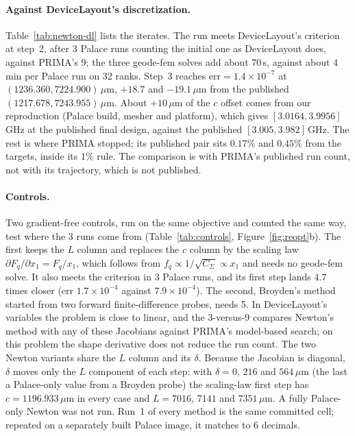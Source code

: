 \documentclass{anvil-paper}
\begin{document}
\paragraph{Against DeviceLayout's discretization.}
Table~\ref{tab:newton-dl} lists the iterates. The run meets DeviceLayout's
criterion at step~2, after 3 Palace runs counting the initial one as
DeviceLayout does, against PRIMA's 9; the three geode-fem solves add about
$70$\,s, against about $4$\,min per Palace run on 32 ranks. Step~3 reaches
$\mathrm{err} = 1.4\times10^{-7}$ at $(1236.360, 7224.900)\,\mu$m, $+18.7$
and $-19.1\,\mu$m from the published $(1217.678, 7243.955)\,\mu$m. About
$+10\,\mu$m of the $c$ offset comes from our reproduction (Palace build,
mesher and platform), which gives $[3.0164, 3.9956]$\,GHz at the published
final design, against the published $[3.005, 3.982]$\,GHz. The rest is
where PRIMA stopped; its published pair sits $0.17\%$ and $0.45\%$ from the
targets, inside its $1\%$ rule. The comparison is with PRIMA's published
run count, not with its trajectory, which is not published.

\paragraph{Controls.}
Two gradient-free controls, run on the same objective and counted the same
way, test where the 3 runs come from (Table~\ref{tab:controls},
Figure~\ref{fig:reopt}b). The first keeps the $L$ column and replaces the
$c$ column by the scaling law $\partial F_q/\partial x_1 = F_q/x_1$, which
follows from $f_q \propto 1/\sqrt{C_\Sigma} \propto x_1$ and needs no
geode-fem solve. It also meets the criterion in 3 Palace runs, and its first
step lands $4.7$ times closer (err $1.7\times10^{-4}$ against
$7.9\times10^{-4}$). The second, Broyden's method \citep{broyden1965class}
started from two forward finite-difference probes, needs 5. In
DeviceLayout's variables the problem is close to linear, and the 3-versus-9
compares Newton's method with any of these Jacobians against PRIMA's
model-based search; on this problem the shape derivative does not reduce
the run count. The two Newton variants share the $L$ column and its
$\delta$. Because the Jacobian is diagonal, $\delta$ moves only the $L$
component of each step: with $\delta = 0$, $216$ and $564\,\mu$m (the last
a Palace-only value from a Broyden probe) the scaling-law first step has
$c = 1196.933\,\mu$m in every case and $L = 7016$, $7141$ and
$7351\,\mu$m. A fully Palace-only Newton was not run. Run~1 of every method
is the same committed cell; repeated on a separately built Palace image, it
matches to 6 decimals.
\end{document}
